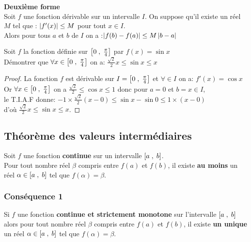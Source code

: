  \textbf{\color{magenta}Deuxième forme} \\
 Soit $ f $ une fonction dérivable sur un intervalle $ I $. On suppose qu'il existe un réel $ M$ tel que :\colorbox{green!20!}{ $ \left\lvert  f'(x) \right\rvert \leq M $} \quad pour tout $ x\in I $. \\ Alors pour tous $a $ et $ b$ de $ I $   on a :\colorbox{green!20!} {$ \left\lvert  f(b)-f(a) \right\rvert\leq M \left\lvert b-a \right\rvert$}
 
\begin{exercice}
 Soit $ f $ la fonction définie sur $ \left[0\;,\; \frac{\pi}{4}\right] $ par $ f(x)= \sin x $\\
 Démontrer que $ \forall x \in \left[0\;,\; \frac{\pi}{4}\right] $ on a: $ \frac{\sqrt{2}}{2}x \leq \sin x \leq x $\\
\end{exercice}
\begin{proof}
 La fonction $ f $ est dérivable sur $ I=\left[0\;,\; \frac{\pi}{4}\right] $  et $ \forall \in I $ on a: $ f'(x)=\cos x $ \\ Or $ \forall x \in \left[0\;,\; \frac{\pi}{4}\right] $ on a $ \frac{\sqrt{2}}{2} \leq \cos x \leq 1 $ donc pour $ a=0 $ et $ b=x\in I $,\\ le T.I.A.F donne: $-1\times \frac{\sqrt{2}}{2}(x-0) \leq \sin x -\sin 0 \leq 1\times (x-0) $\\ d'où   $ \frac{\sqrt{2}}{2}x \leq \sin x \leq x $.
 \end{proof}
 \subsection{ Théorème des valeurs intermédiaires}
 \begin{theorem}[T.V.I]
 Soit $ f $ une fonction \textbf{\color{magenta}continue} sur un intervalle $ \left[a\;,\; b\right] $. \\
 Pour tout nombre réel $ \beta $ compris entre $f(a) $ et $f(b) $, il existe \textbf{\color{magenta} au moins} un réel $ \alpha \in \left[a\;,\; b\right] $ tel que $ f(\alpha)= \beta. $
 \end{theorem}
 
 \subsubsection*{Conséquence 1}
  Si $ f $ une fonction \textbf{\color{magenta}continue et strictement monotone} sur  l'intervalle $ \left[a\;,\; b\right] $ alors pour tout nombre réel $ \beta $ compris entre $f(a) $ et $f(b) $, il existe  \textbf{\color{magenta}un unique} un réel $ \alpha \in \left[a\;,\; b\right] $ tel que $ f(\alpha)= \beta. $
